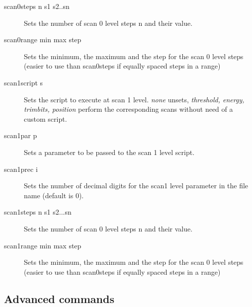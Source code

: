 \documentclass{article}
\begin{document}
\begin{description}
 \item[scan0steps n s1 s2..sn]  Sets the number of scan 0 level steps n and their value.      
 \item[scan0range min max step] Sets the minimum, the maximum and the step for the scan 0 level steps (easier to use than scan0steps if equally spaced steps in a range)      
 \item[scan1script s]      Sets the script to execute at scan 1 level.   \textit{none} unsets,  \textit{threshold, energy, trimbits, position} perform the corresponding scans without need of a custom script.    
 \item[scan1par p]     Sets a parameter to be passed to the scan 1 level script.          
 \item[scan1prec i]        Sets the number of decimal digits for the scan1 level parameter in the file name (default is 0).
 \item[scan1steps n s1 s2...sn]     Sets the number of scan 0 level steps n and their value.       
 \item[scan1range min max step]       Sets the minimum, the maximum and the step for the scan 0 level steps (easier to use than scan0steps if equally spaced steps in a range)      
\end{description}

\begin{comment}
\subsection{Debug}

\begin{description}
\item[moduleversion]   
\item[detectornumber]  
\item[modulenumber]    
\item[detectorversion] 
\item[softwareversion] 
\item[thisversion]  
\item[detectorsvnversion]       
\item[digitest]        
\item[bustest]    
\item[acqtest]
\end{description}
\end{comment}
\subsection{Advanced commands}
\end{document}
